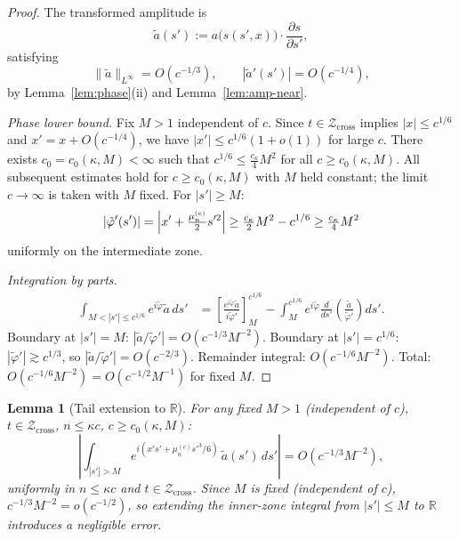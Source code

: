 \documentclass[12pt,a4paper]{amsart}
\newtheorem{lemma}[theorem]{Lemma}
\theoremstyle{definition}
\theoremstyle{remark}
\newcommand{\Zcross}{\mathcal{Z}_{\mathrm{cross}}}
\begin{document}
\begin{proof}
The transformed amplitude is
\begin{equation}
\label{eq:atilde-def}
  \tilde{a}(s') := a\bigl(s(s',x)\bigr)
  \cdot \frac{\partial s}{\partial s'},
\end{equation}
satisfying
\begin{equation}
\label{eq:atilde-bounds}
  \|\tilde{a}\|_{L^\infty} = O(c^{-1/3}),
  \qquad
  |\tilde{a}'(s')| = O(c^{-1/4}),
\end{equation}
by Lemma~\ref{lem:phase}(ii) and Lemma~\ref{lem:amp-near}.

\textit{Phase lower bound.}
Fix $M > 1$ independent of $c$.
Since $t \in \Zcross$ implies $|x| \le c^{1/6}$
and $x' = x + O(c^{-1/4})$,
we have $|x'| \le c^{1/6}(1+o(1))$ for large $c$.
There exists $c_0 = c_0(\kappa, M) < \infty$ such that
$c^{1/6} \le \tfrac{c_\kappa}{4}M^2$
for all $c \ge c_0(\kappa, M)$.
All subsequent estimates hold for
$c \ge c_0(\kappa, M)$ with $M$ held constant;
the limit $c \to \infty$ is taken with $M$ fixed.
For $|s'| \ge M$:
\[
  |\tilde\varphi'(s')| = \Bigl|x' + \tfrac{\mu_n^{(c)}}{2}s'^2\Bigr|
  \ge \tfrac{c_\kappa}{2}M^2 - c^{1/6}
  \ge \tfrac{c_\kappa}{4}M^2
\]
uniformly on the intermediate zone.

\textit{Integration by parts.}
\begin{align*}
  \int_{M < |s'| \le c^{1/6}}
  e^{i\tilde\varphi}\tilde{a}\,ds'
  &=
  \left[\frac{e^{i\tilde\varphi}\tilde{a}}
             {i\tilde\varphi'}\right]_{M}^{c^{1/6}}
  - \int_{M}^{c^{1/6}}
    e^{i\tilde\varphi}
    \frac{d}{ds'}\!\left(\frac{\tilde{a}}{\tilde\varphi'}\right)
    ds'.
\end{align*}
Boundary at $|s'|=M$:
$|\tilde{a}/\tilde\varphi'| = O(c^{-1/3}M^{-2})$.
Boundary at $|s'|=c^{1/6}$:
$|\tilde\varphi'| \gtrsim c^{1/3}$,
so $|\tilde{a}/\tilde\varphi'| = O(c^{-2/3})$.
Remainder integral: $O(c^{-1/6}M^{-2})$.
Total: $O(c^{-1/6}M^{-2}) = O(c^{-1/2}M^{-1})$
for fixed $M$.
\end{proof}

\begin{lemma}[Tail extension to $\mathbb{R}$]
\label{lem:tail-ext}
For any fixed $M > 1$ \textup{(}independent of $c$\textup{)},
$t \in \Zcross$,
$n \le \kappa c$, $c \ge c_0(\kappa, M)$:
\[
\left|
\int_{|s'| > M}
e^{i(x's' + \mu_n^{(c)}s'^3/6)}\,
\tilde{a}(s')\,ds'
\right|
= O(c^{-1/3} M^{-2}),
\]
uniformly in $n \le \kappa c$ and $t \in \Zcross$.
Since $M$ is fixed \textup{(}independent of $c$\textup{)},
$c^{-1/3}M^{-2} = o(c^{-1/2})$,
so extending the inner-zone
integral from $|s'| \le M$ to $\mathbb{R}$
introduces a negligible error.
\end{lemma}
\end{document}
